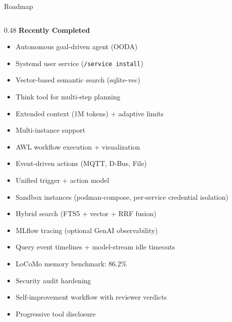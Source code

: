 \documentclass[aspectratio=169,10pt]{beamer}
\begin{document}
\begin{frame}{Roadmap}
\begin{columns}[T]
\begin{column}{0.48\textwidth}
\textbf{Recently Completed}
\begin{itemize}\scriptsize\setlength{\itemsep}{0.5pt}
  \item \textcolor{green!60!black}{\checkmark} \alert{Autonomous goal-driven agent (OODA)}
  \item \textcolor{green!60!black}{\checkmark} Systemd user service (\texttt{/service install})
  \item \textcolor{green!60!black}{\checkmark} Vector-based semantic search (sqlite-vec)
  \item \textcolor{green!60!black}{\checkmark} Think tool for multi-step planning
  \item \textcolor{green!60!black}{\checkmark} Extended context (1M tokens) + adaptive limits
  \item \textcolor{green!60!black}{\checkmark} Multi-instance support
  \item \textcolor{green!60!black}{\checkmark} AWL workflow execution + visualization
  \item \textcolor{green!60!black}{\checkmark} \alert{Event-driven actions} (MQTT, D-Bus, File)
  \item \textcolor{green!60!black}{\checkmark} Unified trigger + action model
  \item \textcolor{green!60!black}{\checkmark} \alert{Sandbox instances} (podman-compose, per-service credential isolation)
  \item \textcolor{green!60!black}{\checkmark} Hybrid search (FTS5 + vector + RRF fusion)
  \item \textcolor{green!60!black}{\checkmark} \alert{MLflow tracing} (optional GenAI observability)
  \item \textcolor{green!60!black}{\checkmark} Query event timelines + model-stream idle timeouts
  \item \textcolor{green!60!black}{\checkmark} LoCoMo memory benchmark: 86.2\%
  \item \textcolor{green!60!black}{\checkmark} \alert{Security audit hardening}
  \item \textcolor{green!60!black}{\checkmark} \alert{Self-improvement} workflow with reviewer verdicts
  \item \textcolor{green!60!black}{\checkmark} \alert{Progressive tool disclosure}

\end{itemize}
\end{column}
\end{columns}
\end{frame}
\end{document}

